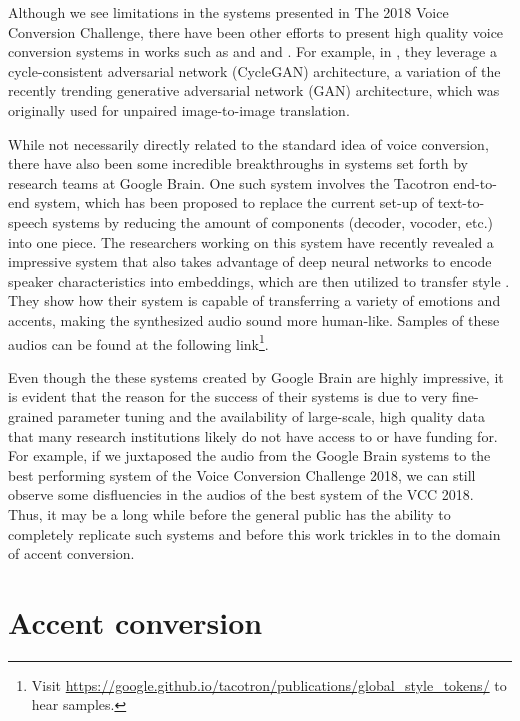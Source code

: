 \documentclass
[
    a4paper,
    twoside,
    12pt,
]
{report}
\begin{document}
Although we see limitations in the systems presented in The 2018 Voice
Conversion Challenge, there have been other efforts to present high
quality voice conversion systems in works such as and
\textcite{nguyen2016} and \textcite{fang2018}. For example, in
\textcite{fang2018}, they leverage a cycle-consistent adversarial
network (CycleGAN) architecture, a variation of the recently trending
generative adversarial network (GAN) architecture, which was originally
used for unpaired image-to-image translation.

While not necessarily directly related to the standard idea of voice
conversion, there have also been some incredible breakthroughs in
systems set forth by research teams at Google Brain. One such system
involves the Tacotron end-to-end system, which has been proposed to
replace the current set-up of text-to-speech systems by reducing the
amount of components (decoder, vocoder, etc.) into one piece. The
researchers working on this system have recently revealed a impressive
system that also takes advantage of deep neural networks to encode
speaker characteristics into embeddings, which are then utilized to
transfer style \parencite{wang2018}. They show how their system is
capable of transferring a variety of emotions and accents, making the
synthesized audio sound more human-like. Samples of these audios can be
found at the following
link\footnote{Visit \url{https://google.github.io/tacotron/publications/global_style_tokens/} to hear samples.}.

Even though the these systems created by Google Brain are highly
impressive, it is evident that the reason for the success of their
systems is due to very fine-grained parameter tuning and the
availability of large-scale, high quality data that many research
institutions likely do not have access to or have funding for. For
example, if we juxtaposed the audio from the Google Brain systems to the
best performing system of the Voice Conversion Challenge 2018, we can
still observe some disfluencies in the audios of the best system of the
VCC 2018. Thus, it may be a long while before the general public has the
ability to completely replicate such systems and before this work
trickles in to the domain of accent conversion.

\hypertarget{accent-conversion}{%
\section{Accent conversion}\label{accent-conversion}}
\end{document}
